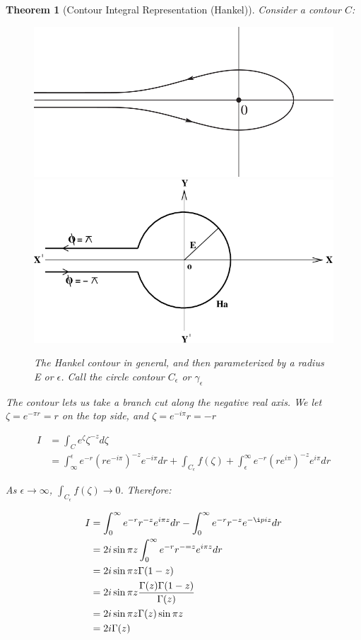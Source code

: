 \documentclass{article}
\newtheorem{theorem}{Theorem}[section]
\theoremstyle{definition}
\begin{document}
\begin{theorem}[Contour Integral Representation (Hankel)]
Consider a contour $C$:
\begin{figure}[H]
	\centering
	\includegraphics[width=0.7\linewidth]{hankel_contour}
	\includegraphics[width=0.7\linewidth]{hankel2}
	\caption{The Hankel contour in general, and then parameterized by a radius E or $\epsilon$. Call the circle contour $C_\epsilon$ or $\gamma_\epsilon$}
	\label{fig:hankelcontour}
\end{figure}



The contour lets us take a branch cut along the negative real axis. We let $\zeta = e^{-\pi r} = r$ on the top side, and $\zeta = e^{-i\pi}r = -r$


\begin{align*}
I &= \int_{C} e^{\zeta} \zeta^{-z} d\zeta \\ 
&= \int_{\infty}^{\epsilon} e^{-r} (re^{-i\pi})^{-z} e^{-i\pi}dr + \int_{C_\epsilon} f(\zeta) + \int_{\epsilon}^{\infty} e^{-r} (re^{i\pi})^{-z} e^{i\pi}dr
\end{align*}

As $\epsilon \to \infty$, $\int_{C_\epsilon} f(\zeta) \to 0$. Therefore:

\begin{align*}
I &= \int_{0}^{\infty} e^{-r} r^{-z} e^{i\pi z}dr  - \int_{0}^{\infty} e^{-r} r^{-z} e^{-\i pi z} dr \\ 
&= 2 i \sin \pi z  \int_{0}^{\infty} e^{-r} r^{-= z} e^{i\pi z}dr \\ 
&=  2 i \sin \pi z \Gamma(1-z) \\ 
&=  2 i \sin \pi z \frac{\Gamma(z)\Gamma(1-z)}{\Gamma(z)} \\ 
&= { 2 i \sin \pi z }{\Gamma(z) \sin \pi z} \\ 
&= { 2 i }{\Gamma(z) } 
\end{align*}


\end{theorem}
\end{document}
